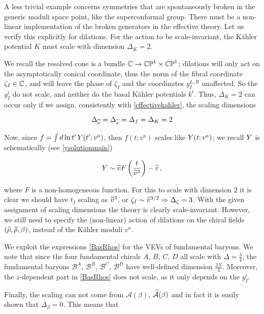A less trivial example concerns symmetries that are spontaneously broken in the generic moduli space point, like the superconformal group. There must be a non-linear implementation of the broken generators in the effective theory. Let us verify this explicitly for dilations. For the action to be scale-invariant, the K\"ahler potential $K$ must scale with dimension $\Delta_K = 2$. 

We recall the resolved cone is a bundle $\mathbb{C} \rightarrow \mathbb{CP}^1\times\mathbb{CP}^1$; dilations will only act on the asymptotically conical coordinate, thus the norm of the fibral coordinate $\zeta_I \in \mathbb{C}$, and will leave the phase of $\zeta_I$ and the coordinates $y^{L,R}_I$ unaffected. So the $y^i_I$ do not scale, and neither do the basal K\"ahler potentials $k^i$. Thus, $\Delta_K = 2$ can occur only if we assign, consistently with \eqref{effectivekahler}, the scaling dimensions

\begin{equation}
	\Delta_{\widehat{v}} = \Delta_{\widetilde{v}} = \Delta_f = \Delta_K = 2
	\label{}
\end{equation}


Now, since $f = \int d\ln t' \, Y(t';v^a)$, then $f(t;v^a)$ scales like $Y(t;v^a)$; we recall $Y$ is schematically (see \eqref{ysolutionmain})

\begin{equation}
	Y \sim \widetilde{v} F\left( \frac{t}{{\widetilde{v}}^3} \right) - \widehat{v}\,,
	\label{}
\end{equation}

where $F$ is a non-homogeneous function. For this to scale with dimension $2$ it is clear we should have $t_I$ scaling as $\widetilde{v}^3$, or $\zeta_I \sim {\ensuremath{\widetilde{v}}}^{3/2} \Rightarrow \Delta_\zeta = 3$. With the given assignment of scaling dimensions the theory is clearly scale-invariant. However, we still need to specify the (non-linear) action of dilations on the chiral fields $(\widehat{\rho},\widetilde{\rho},\beta)$, instead of the K\"ahler moduli $v^a$. 

We exploit the expressions \eqref{BasRhos} for the VEVs of fundamental baryons. We note that since the four fundamental chirals $A$, $B$, $C$, $D$ all scale with $\Delta = \frac{3}{4}$, the fundamental baryons $\mathcal{B}^A$, $\mathcal{B}^B$, $\mathcal{B}^C$, $\mathcal{B}^D$ have well-defined dimension $\frac{3N}{4}$. Moreover, the $z$-dependent part in \eqref{BasRhos} does not scale, as it only depends on the $y^i_I$. 

Finally, the scaling can not come from $\mathcal{A}(\beta)$, $\widetilde{\mathcal{A}}(\beta)$ and in fact it is easily shown that $\Delta_\beta = 0$. This means that


